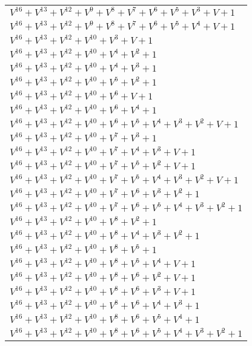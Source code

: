 \documentclass[12pt]{article}
\begin{document}
\begin{adjustwidth}{-4cm}{}
\begin{center}
\begin{longtable}{|l|}
$V^{16}  +V^{13}  +V^{12}  +V^{9}  +V^{8}  +V^{7}  +V^{6}  +V^{5}  +V^{3}  + V + 1$ \\
$V^{16}  +V^{13}  +V^{12}  +V^{9}  +V^{8}  +V^{7}  +V^{6}  +V^{5}  +V^{4}  + V + 1$ \\
$V^{16}  +V^{13}  +V^{12}  +V^{10}  +V^{3}  + V + 1$ \\
$V^{16}  +V^{13}  +V^{12}  +V^{10}  +V^{4}  +V^{2}  + 1$ \\
$V^{16}  +V^{13}  +V^{12}  +V^{10}  +V^{4}  +V^{3}  + 1$ \\
$V^{16}  +V^{13}  +V^{12}  +V^{10}  +V^{5}  +V^{2}  + 1$ \\
$V^{16}  +V^{13}  +V^{12}  +V^{10}  +V^{6}  + V + 1$ \\
$V^{16}  +V^{13}  +V^{12}  +V^{10}  +V^{6}  +V^{4}  + 1$ \\
$V^{16}  +V^{13}  +V^{12}  +V^{10}  +V^{6}  +V^{5}  +V^{4}  +V^{3}  +V^{2}  + V + 1$ \\
$V^{16}  +V^{13}  +V^{12}  +V^{10}  +V^{7}  +V^{3}  + 1$ \\
$V^{16}  +V^{13}  +V^{12}  +V^{10}  +V^{7}  +V^{4}  +V^{3}  + V + 1$ \\
$V^{16}  +V^{13}  +V^{12}  +V^{10}  +V^{7}  +V^{5}  +V^{2}  + V + 1$ \\
$V^{16}  +V^{13}  +V^{12}  +V^{10}  +V^{7}  +V^{5}  +V^{4}  +V^{3}  +V^{2}  + V + 1$ \\
$V^{16}  +V^{13}  +V^{12}  +V^{10}  +V^{7}  +V^{6}  +V^{3}  +V^{2}  + 1$ \\
$V^{16}  +V^{13}  +V^{12}  +V^{10}  +V^{7}  +V^{6}  +V^{5}  +V^{4}  +V^{3}  +V^{2}  + 1$ \\
$V^{16}  +V^{13}  +V^{12}  +V^{10}  +V^{8}  +V^{2}  + 1$ \\
$V^{16}  +V^{13}  +V^{12}  +V^{10}  +V^{8}  +V^{4}  +V^{3}  +V^{2}  + 1$ \\
$V^{16}  +V^{13}  +V^{12}  +V^{10}  +V^{8}  +V^{5}  + 1$ \\
$V^{16}  +V^{13}  +V^{12}  +V^{10}  +V^{8}  +V^{5}  +V^{4}  + V + 1$ \\
$V^{16}  +V^{13}  +V^{12}  +V^{10}  +V^{8}  +V^{6}  +V^{2}  + V + 1$ \\
$V^{16}  +V^{13}  +V^{12}  +V^{10}  +V^{8}  +V^{6}  +V^{3}  + V + 1$ \\
$V^{16}  +V^{13}  +V^{12}  +V^{10}  +V^{8}  +V^{6}  +V^{4}  +V^{3}  + 1$ \\
$V^{16}  +V^{13}  +V^{12}  +V^{10}  +V^{8}  +V^{6}  +V^{5}  +V^{4}  + 1$ \\
$V^{16}  +V^{13}  +V^{12}  +V^{10}  +V^{8}  +V^{6}  +V^{5}  +V^{4}  +V^{3}  +V^{2}  + 1$ \\

\end{longtable}
\end{center}
\end{adjustwidth}
\end{document}
